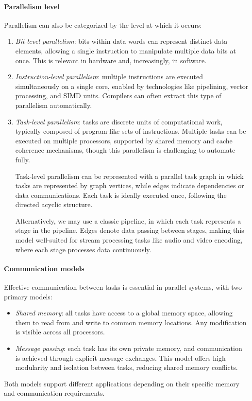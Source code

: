 \paragraph*{Parallelism level}
Parallelism can also be categorized by the level at which it occurs:
\begin{enumerate}
    \item \textit{Bit-level parallelism}: bits within data words can represent distinct data elements, allowing a single instruction to manipulate multiple data bits at once.
        This is relevant in hardware and, increasingly, in software.
    \item \textit{Instruction-level parallelism}: multiple instructions are executed simultaneously on a single core, enabled by technologies like pipelining, vector processing, and SIMD units.
        Compilers can often extract this type of parallelism automatically.
    \item \textit{Task-level parallelism}: tasks are discrete units of computational work, typically composed of program-like sets of instructions.
        Multiple tasks can be executed on multiple processors, supported by shared memory and cache coherence mechanisms, though this parallelism is challenging to automate fully.
        
        Task-level parallelism can be represented with a parallel task graph in whick tasks are represented by graph vertices, while edges indicate dependencies or data communications.
        Each task is ideally executed once, following the directed acyclic structure.

        Alternatively, we may use a classic pipeline, in which each task represents a stage in the pipeline.
        Edges denote data passing between stages, making this model well-suited for stream processing tasks like audio and video encoding, where each stage processes data continuously.
\end{enumerate}

\paragraph*{Communication models}
Effective communication between tasks is essential in parallel systems, with two primary models:
\begin{itemize}
    \item \textit{Shared memory}: all tasks have access to a global memory space, allowing them to read from and write to common memory locations. 
        Any modification is visible across all processors.
    \item \textit{Message passing}: each task has its own private memory, and communication is achieved through explicit message exchanges. 
        This model offers high modularity and isolation between tasks, reducing shared memory conflicts.
\end{itemize}
Both models support different applications depending on their specific memory and communication requirements.

